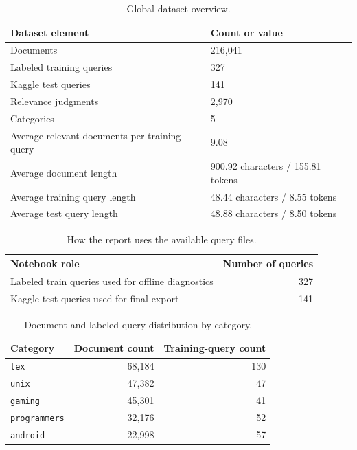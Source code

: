 \documentclass[11pt,a4paper]{article}
\begin{document}
\begin{table}[H]
\centering
\small
\begin{tabularx}{\linewidth}{l Y}
\toprule
Dataset element & Count or value \\
\midrule
Documents & 216,041 \\
Labeled training queries & 327 \\
Kaggle test queries & 141 \\
Relevance judgments & 2,970 \\
Categories & 5 \\
Average relevant documents per training query & 9.08 \\
Average document length & 900.92 characters / 155.81 tokens \\
Average training query length & 48.44 characters / 8.55 tokens \\
Average test query length & 48.88 characters / 8.50 tokens \\
\bottomrule
\end{tabularx}
\caption{Global dataset overview.}
\label{tab:datasetoverview}
\end{table}

\begin{table}[H]
\centering
\small
\begin{tabular}{l r}
\toprule
Notebook role & Number of queries \\
\midrule
Labeled train queries used for offline diagnostics & 327 \\
Kaggle test queries used for final export & 141 \\
\bottomrule
\end{tabular}
\caption{How the report uses the available query files.}
\label{tab:splits}
\end{table}

\begin{table}[H]
\centering
\small
\begin{tabular}{lrr}
\toprule
Category & Document count & Training-query count \\
\midrule
\texttt{tex} & 68,184 & 130 \\
\texttt{unix} & 47,382 & 47 \\
\texttt{gaming} & 45,301 & 41 \\
\texttt{programmers} & 32,176 & 52 \\
\texttt{android} & 22,998 & 57 \\
\bottomrule
\end{tabular}
\caption{Document and labeled-query distribution by category.}
\label{tab:doccats}
\end{table}
\end{document}
